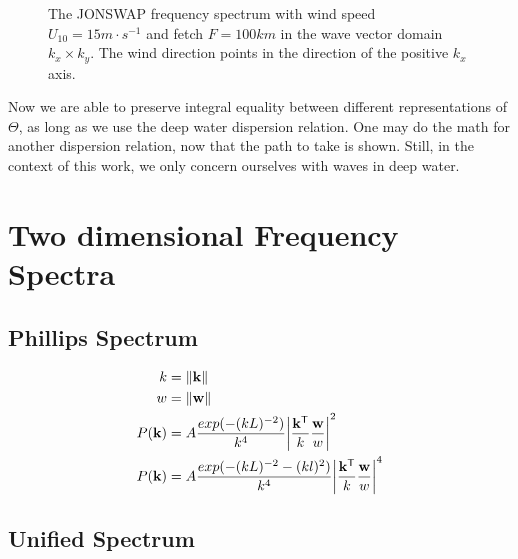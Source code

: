 %
\begin{figure}
\centering
{}
\caption{The JONSWAP frequency spectrum with wind speed $U_{10} = 15m\cdot 
s^{-1}$ and fetch $F = 100km$ in the wave vector domain $k_x \times k_y$. The 
wind direction points in the direction of the positive $k_x$ axis.}
\label{fig:jonswap_3d_kx_ky}
\end{figure}
%
Now we are able to preserve integral equality between different representations 
of $\Theta$, as long as we use the deep water dispersion relation. One may do 
the math for another dispersion relation, now that the path to take is shown. 
Still, in the context of this work, we only concern ourselves with waves in 
deep water.
%
\section{Two dimensional Frequency Spectra}

\subsection{Phillips Spectrum}
\label{sec:phillips_spectrum}

\begin{align}
  k &= \norm{\mvec{k}}\\
  w &= \norm{\mvec{w}}\\
  P(\mvec{k}) &=
A\frac{exp(-(kL)^{-2})}{k^4}\abs*{\frac{\transpose{\mvec{k}}}{k}\frac{\mvec{w}}{
w}}^2\\
  P(\mvec{k}) &=
A\frac{exp(-(kL)^{-2}-(kl)^2)}{k^4}\abs*{\frac{\transpose{\mvec{k}}}{k}\frac{
\mvec{w}}{w}}^4
\end{align}

\subsection{Unified Spectrum}
\label{sec_unified_spectrum}

